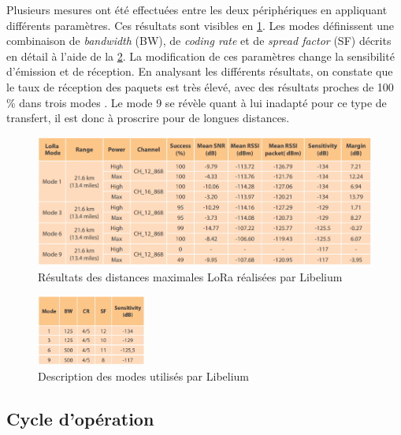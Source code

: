 Plusieurs mesures ont été effectuées entre les deux périphériques en appliquant différents paramètres. Ces résultats sont visibles en \cref{fig-lora_distance_array}. Les modes définissent une combinaison de \textit{bandwidth} (BW), de \textit{coding rate} et de \textit{spread factor} (SF) décrits en détail à l'aide de la \cref{fig-lora_mode_libelium}. La modification de ces paramètres change la sensibilité d'émission et de réception. En analysant les différents résultats, on constate que le taux de réception des paquets est très élevé, avec des résultats proches de 100\,\% dans trois modes \cite{waspmote8:online}. Le mode 9 se révèle quant à lui inadapté pour ce type de transfert, il est donc à proscrire pour de longues distances.

\begin{figure}[ht!]
    \centering
    \includegraphics[width=1.0\textwidth]{Figures/StateOfTheArt/lora_distance_array.png}
    \caption{Résultats des distances maximales LoRa réalisées par Libelium}
    \label{fig-lora_distance_array}
\end{figure}

\begin{figure}[ht!]
    \centering
    \includegraphics[width=0.32\textwidth]{Figures/StateOfTheArt/lora_mode_libelium.png}
    \caption{Description des modes utilisés par Libelium}
    \label{fig-lora_mode_libelium}
\end{figure}



\FloatBarrier
\subsection{Cycle d'opération}
\label{sec-stateoftheart_lora_dutycycle}

